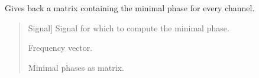 \documentclass[letterpaper,10pt,english]{sphinxmanual}
\begin{document}
\begin{fulllineitems}
\label{\detokenize{modules/dsptools.standard_functions:dsptools.standard_functions.minimal_phase}}
\pysigstartsignatures
{}
\pysigstopsignatures
\sphinxAtStartPar
Gives back a matrix containing the minimal phase for every channel.
\begin{quote}\begin{description}
\begin{description}
\sphinxlineitem{\sphinxstylestrong{signal}}{[}Signal{]}
\sphinxAtStartPar
Signal for which to compute the minimal phase.

\end{description}

\begin{description}
\sphinxlineitem{\sphinxstylestrong{f}}{[}\sphinxtitleref{np.ndarray}{]}
\sphinxAtStartPar
Frequency vector.

\sphinxlineitem{\sphinxstylestrong{min\_phases}}{[}\sphinxtitleref{np.ndarray}{]}
\sphinxAtStartPar
Minimal phases as matrix.

\end{description}

\end{description}\end{quote}

\end{fulllineitems}

\end{document}
